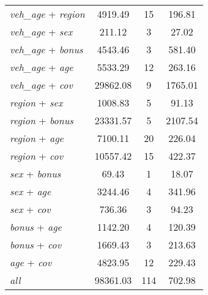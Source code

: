 {\begin{ThreePartTable}
\begin{longtable}{lccc}
    \textit{veh\_age} + \textit{region} &  4919.49 &       15 &   196.81 \\
    \textit{veh\_age} + \textit{sex} &   211.12 &        3 &    27.02 \\
    \textit{veh\_age} + \textit{bonus} &  4543.46 &        3 &   581.40 \\
    \textit{veh\_age} + \textit{age} &  5533.29 &       12 &   263.16 \\
    \textit{veh\_age} + \textit{cov} & 29862.08 &        9 &  1765.01 \\
    \textit{region} + \textit{sex} &  1008.83 &        5 &    91.13 \\
    \textit{region} + \textit{bonus} & 23331.57 &        5 &  2107.54 \\
    \textit{region} + \textit{age} &  7100.11 &       20 &   226.04 \\
    \textit{region} + \textit{cov} & 10557.42 &       15 &   422.37 \\
    \textit{sex} + \textit{bonus} &    69.43 &        1 &    18.07 \\
    \textit{sex} + \textit{age} &  3244.46 &        4 &   341.96 \\
    \textit{sex} + \textit{cov} &   736.36 &        3 &    94.23 \\
    \textit{bonus} + \textit{age} &  1142.20 &        4 &   120.39 \\
    \textit{bonus} + \textit{cov} &  1669.43 &        3 &   213.63 \\
    \textit{age} + \textit{cov} &  4823.95 &       12 &   229.43 \\
    \textit{all}\tnote{\ddag} & 98361.03 &      114 &   702.98 \\

\end{longtable}
\end{ThreePartTable}
}
